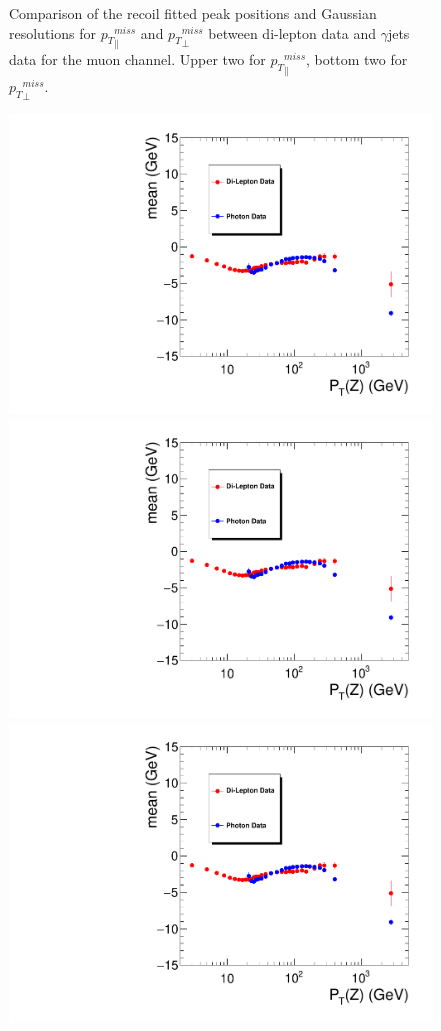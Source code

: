 \begin{figure}[htbp]
\begin{center}
\caption{Comparison of the recoil fitted peak positions and Gaussian resolutions for ${p_{T}}^{miss}_\parallel$ and ${p_{T}}^{miss}_\perp$ between di-lepton data and $\gamma$jets data for the muon channel. Upper two for 
${p_{T}}^{miss}_\parallel$, bottom two for ${p_{T}}^{miss}_\perp$.}
\label{fig:recoilfit_met_peak_reso_compare_data_gjets_mu}
\end{center}
\end{figure}

\begin{figure}[htbp]
\begin{center}
\includegraphics[width=0.46\linewidth, page=1]{figures/plots_SingleEMU_Run2016Full_03Feb2017_allcorV2_met_para_study_ZSelecLowLPt_el_VS_SinglePhoton_Run2016Full_03Feb2017_allcorV2_NoRecoil_met_para_study_ZSelecLowLPt_el.pdf}
\includegraphics[width=0.46\linewidth, page=5]{figures/plots_SingleEMU_Run2016Full_03Feb2017_allcorV2_met_para_study_ZSelecLowLPt_el_VS_SinglePhoton_Run2016Full_03Feb2017_allcorV2_NoRecoil_met_para_study_ZSelecLowLPt_el.pdf}
\includegraphics[width=0.46\linewidth, page=3]{figures/plots_SingleEMU_Run2016Full_03Feb2017_allcorV2_met_para_study_ZSelecLowLPt_el_VS_SinglePhoton_Run2016Full_03Feb2017_allcorV2_NoRecoil_met_para_study_ZSelecLowLPt_el.pdf}

\end{center}
\end{figure}
